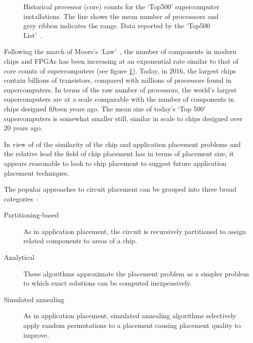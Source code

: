 			\begin{figure}
				\center
				
				\caption[Historical core counts for the `Top500' supercomputers.]%
				{Historical processor (core) counts for the `Top500' supercomputer
				installations. The line shows the mean number of processsors and grey
				ribbon indicates the range. Data reported by the `Top500
				List'~\cite{meuer16j}.}
				\label{fig:top500-num-processors}
			\end{figure}
			
			Following the march of Moore's `Law'~\cite{moore75}, the number of
			components in modern chips and FPGAs has been increasing at an
			exponential rate similar to that of core counts of supercomputers (see
			figure \ref{fig:top500-num-processors}). Today, in 2016, the largest
			chips contain billions of transistors, compared with millions of
			processors found in supercomputers. In terms of the raw number of
			processors, the world's largest supercomputers are at a scale comparable
			with the number of components in chips designed fifteen years ago. The
			mean size of today's `Top 500' supercomputers is somewhat smaller still,
			similar in scale to chips designed over 20 years ago.
			
			In view of of the similarity of the chip and application placement
			problems and the relative lead the field of chip placement has in terms
			of placement size, it appears reasonable to look to chip placement to
			suggest future application placement techniques.
			
			The popular approaches to circuit placement can be grouped into three
			broad categories~\cite{kahng11}:
			
			\begin{description}
				
				\item[Partitioning-based] As in application placement, the circuit is
				recursively partitioned to assign related components to areas of a
				chip.
				
				\item[Analytical] These algorithms approximate the placement problem as
				a simpler problem to which exact solutions can be computed
				inexpensively.
				
				\item[Simulated annealing] As in application placement, simulated
				annealing algorithms selectively apply random permutations to a
				placement causing placement quality to improve.
				
			\end{description}
			
